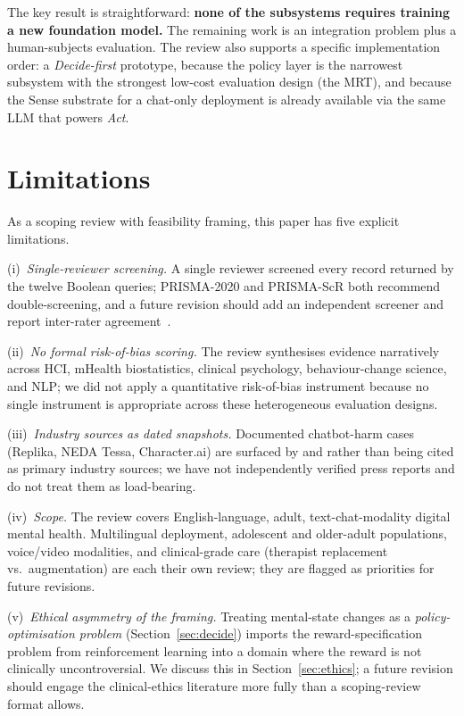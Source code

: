 \documentclass[10pt,conference]{article}
\newcommand{\secref}[1]{Section~\ref{#1}}
\begin{document}
The key result is straightforward: \textbf{none of the subsystems
requires training a new foundation model.} The remaining work is an
integration problem plus a human-subjects evaluation. The review also
supports a specific implementation order: a \emph{Decide-first}
prototype, because the policy layer is the narrowest subsystem with
the strongest low-cost evaluation design (the MRT), and because the
Sense substrate for a chat-only deployment is already available via
the same LLM that powers \emph{Act}.

\section{Limitations}\label{sec:limitations}

As a scoping review with feasibility framing, this paper has five
explicit limitations.

(i)~\emph{Single-reviewer screening.} A single reviewer screened
every record returned by the twelve Boolean queries; PRISMA-2020 and
PRISMA-ScR both recommend double-screening, and a future revision
should add an independent screener and report inter-rater
agreement~\cite{Tricco2018PRISMAScR,Page2021PRISMA}.

(ii)~\emph{No formal risk-of-bias scoring.} The review synthesises
evidence narratively across HCI, mHealth biostatistics, clinical
psychology, behaviour-change science, and NLP; we did not apply a
quantitative risk-of-bias instrument because no single instrument is
appropriate across these heterogeneous evaluation designs.

(iii)~\emph{Industry sources as dated snapshots.} Documented
chatbot-harm cases (Replika, NEDA Tessa, Character.ai) are surfaced by
\cite{DeFreitas2024ChatbotSafety} and \cite{Scholich2025TherapistVsChatbot}
rather than being cited as primary industry sources; we have not
independently verified press reports and do not treat them as
load-bearing.

(iv)~\emph{Scope.} The review covers English-language, adult,
text-chat-modality digital mental health. Multilingual deployment,
adolescent and older-adult populations, voice/video modalities, and
clinical-grade care (therapist replacement vs.\ augmentation) are each
their own review; they are flagged as priorities for future revisions.

(v)~\emph{Ethical asymmetry of the framing.} Treating mental-state
changes as a \emph{policy-optimisation problem}
(\secref{sec:decide}) imports the reward-specification problem from
reinforcement learning into a domain where the reward is not
clinically uncontroversial. We discuss this in
\secref{sec:ethics}; a future revision should engage the
clinical-ethics literature more fully than a scoping-review format
allows.
\end{document}
